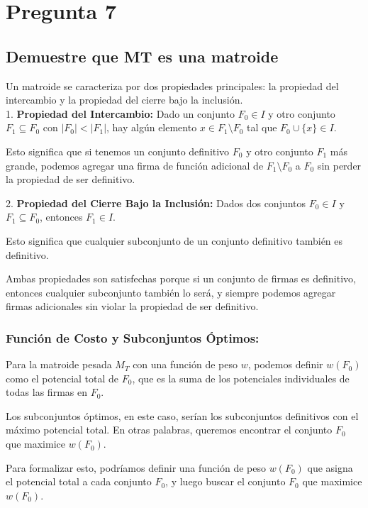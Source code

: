 \documentclass{article}
\begin{document}
\section*{Pregunta 7}

\subsection*{Demuestre que MT es una matroide}
Un matroide se caracteriza por dos propiedades principales: la propiedad del intercambio y la propiedad del cierre bajo la inclusión.\\

1. \textbf{Propiedad del Intercambio:} Dado un conjunto $F_0 \in I$ y otro conjunto $F_1 \subseteq F_0$ con $|F_0| < |F_1|$, hay algún elemento $x \in F_1 \setminus F_0$ tal que $F_0 \cup \{x\} \in I$.

Esto significa que si tenemos un conjunto definitivo $F_0$ y otro conjunto $F_1$ más grande, podemos agregar una firma de función adicional de $F_1 \setminus F_0$ a $F_0$ sin perder la propiedad de ser definitivo.

2. \textbf{Propiedad del Cierre Bajo la Inclusión:} Dados dos conjuntos $F_0 \in I$ y $F_1 \subseteq F_0$, entonces $F_1 \in I$.

Esto significa que cualquier subconjunto de un conjunto definitivo también es definitivo.

Ambas propiedades son satisfechas porque si un conjunto de firmas es definitivo, entonces cualquier subconjunto también lo será, y siempre podemos agregar firmas adicionales sin violar la propiedad de ser definitivo.

\subsubsection*{Función de Costo y Subconjuntos Óptimos:}

Para la matroide pesada $M_T$ con una función de peso $w$, podemos definir $w(F_0)$ como el potencial total de $F_0$, que es la suma de los potenciales individuales de todas las firmas en $F_0$.

Los subconjuntos óptimos, en este caso, serían los subconjuntos definitivos con el máximo potencial total. En otras palabras, queremos encontrar el conjunto $F_0$ que maximice $w(F_0)$.

Para formalizar esto, podríamos definir una función de peso $w(F_0)$ que asigna el potencial total a cada conjunto $F_0$, y luego buscar el conjunto $F_0$ que maximice $w(F_0)$.
\end{document}
